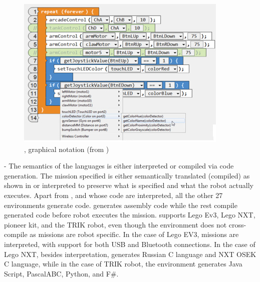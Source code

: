 \begin{figure}[t]
	\centering
		\includegraphics[width=\columnwidth]{robotCgraphical.png}	\caption{\robotc, graphical notation (from \cite{Schunn2017}) }
	\label{fig:robotcgraphical}
\end{figure}




\parhead{\fsemantics} - The semantics of the languages is either interpreted or compiled via code generation. The mission specified is either semantically translated (compiled) as shown in   or interpreted to preserve what is specified and what the robot actually executes. Apart from \lego, and \codelab whose code are interpreted, all the other 27 environments generate code. \metabot generates assembly code while the rest compile generated code before robot executes the mission.  \trik supports Lego Ev3, Lego NXT, pioneer kit, and the TRIK robot, even though the environment does not cross-compile as missions are robot specific. In the case of Lego EV3, missions are interpreted, with support for both USB and Bluetooth connections.
In the case of Lego NXT, besides interpretation, \trik generates Russian C language and NXT OSEK C language, while in the case of TRIK robot, the environment generates Java Script, PascalABC, Python, and F\#.%

